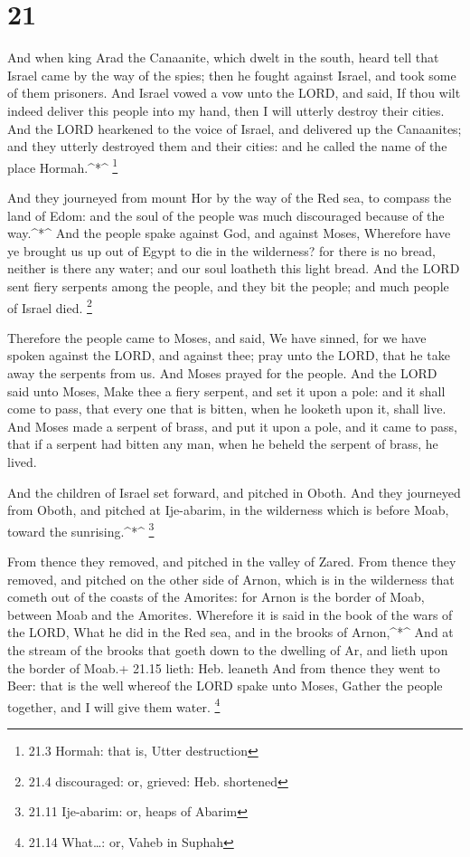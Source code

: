 \hypertarget{section-20}{%
\section{21}\label{section-20}}

 And when king Arad the Canaanite, which dwelt in the south,
heard tell that Israel came by the way of the spies; then he fought
against Israel, and took some of them prisoners.  And Israel
vowed a vow unto the LORD, and said, If thou wilt indeed deliver this
people into my hand, then I will utterly destroy their cities.
 And the LORD hearkened to the voice of Israel, and
delivered up the Canaanites; and they utterly destroyed them and their
cities: and he called the name of the place Hormah.\^{}*\^{} \footnote{21.3
  Hormah: that is, Utter destruction}

 And they journeyed from mount Hor by the way of the Red
sea, to compass the land of Edom: and the soul of the people was much
discouraged because of the way.\^{}*\^{}  And the people
spake against God, and against Moses, Wherefore have ye brought us up
out of Egypt to die in the wilderness? for there is no bread, neither is
there any water; and our soul loatheth this light bread. 
And the LORD sent fiery serpents among the people, and they bit the
people; and much people of Israel died. \footnote{21.4 discouraged: or,
  grieved: Heb. shortened}

 Therefore the people came to Moses, and said, We have
sinned, for we have spoken against the LORD, and against thee; pray unto
the LORD, that he take away the serpents from us. And Moses prayed for
the people.  And the LORD said unto Moses, Make thee a fiery
serpent, and set it upon a pole: and it shall come to pass, that every
one that is bitten, when he looketh upon it, shall live. 
And Moses made a serpent of brass, and put it upon a pole, and it came
to pass, that if a serpent had bitten any man, when he beheld the
serpent of brass, he lived.

 And the children of Israel set forward, and pitched in
Oboth.  And they journeyed from Oboth, and pitched at
Ije-abarim, in the wilderness which is before Moab, toward the
sunrising.\^{}*\^{} \footnote{21.11 Ije-abarim: or, heaps of Abarim}

 From thence they removed, and pitched in the valley of
Zared.  From thence they removed, and pitched on the other
side of Arnon, which is in the wilderness that cometh out of the coasts
of the Amorites: for Arnon is the border of Moab, between Moab and the
Amorites.  Wherefore it is said in the book of the wars of
the LORD, What he did in the Red sea, and in the brooks of
Arnon,\^{}*\^{}  And at the stream of the brooks that goeth
down to the dwelling of Ar, and lieth upon the border of Moab.+ 21.15
lieth: Heb. leaneth  And from thence they went to Beer:
that is the well whereof the LORD spake unto Moses, Gather the people
together, and I will give them water. \footnote{21.14 What\ldots: or,
  Vaheb in Suphah}

